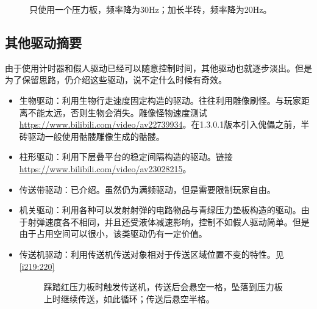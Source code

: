 \begin{figure}[!ht]
\begin{center}
\qquad
{}
\end{center}
\caption{\protect{}只使用一个压力板，频率降为30Hz；\protect{}加长半砖，频率降为20Hz。}
\label{i235:236}
\end{figure}

\subsection{其他驱动摘要}
由于使用计时器和假人驱动已经可以随意控制时间，其他驱动也就逐步淡出。但是为了保留思路，仍介绍这些驱动，说不定什么时候有奇效。
\begin{itemize}
\item 生物驱动：利用生物行走速度固定构造的驱动。往往利用雕像刷怪。与玩家距离不能太远，否则生物会消失。雕像怪物速度测试\url{https://www.bilibili.com/video/av22739934}。在1.3.0.1版本引入傀儡之前，半砖驱动一般使用骷髅雕像生成的骷髅。
\item 柱形驱动：利用下层叠平台的稳定间隔构造的驱动。链接\url{https://www.bilibili.com/video/av23028215}。
\item 传送带驱动：已介绍。虽然仍为满频驱动，但是需要限制玩家自由。
\item 机关驱动：利用各种可以发射射弹的电路物品与青绿压力垫板构造的驱动。由于射弹速度各不相同，并且还受液体减速影响，控制不如假人驱动简单。但是由于占用空间可以很小，该类驱动仍有一定价值。
\item 传送机驱动：利用传送机传送对象相对于传送区域位置不变的特性。见\autoref{i219:220}

\begin{figure}[!ht]
\begin{center}
\qquad
{}
\end{center}
\caption{\protect{}踩踏红压力板时触发传送机，传送后会悬空一格，坠落到压力板上时继续传送，如此循环；\protect{}传送后悬空半格。}
\label{i219:220}
\end{figure}

\end{itemize}

